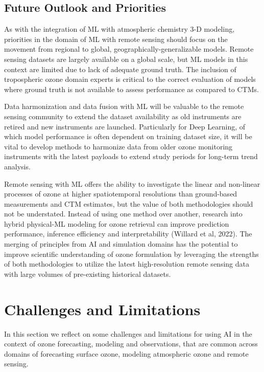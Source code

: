\documentclass[gmd, manuscript]{copernicus}
\begin{document}
\subsection{Future Outlook and Priorities}
As with the integration of ML with atmospheric chemistry 3-D modeling, priorities in the domain of ML with remote sensing should focus on the movement from regional to global, geographically-generalizable models. Remote sensing datasets are largely available on a global scale, but ML models in this context are limited due to lack of adequate ground truth. The inclusion of tropospheric ozone domain experts is critical to the correct evaluation of models where ground truth is not available to assess performance as compared to CTMs. 

Data harmonization and data fusion with ML will be valuable to the remote sensing community to extend the dataset availability as old instruments are retired and new instruments are launched. Particularly for Deep Learning, of which model performance is often dependent on training dataset size, it will be vital to develop methods to harmonize data from older ozone monitoring instruments with the latest payloads to extend study periods for long-term trend analysis. 

Remote sensing with ML offers the ability to investigate the linear and non-linear processes of ozone at higher spatiotemporal resolutions than ground-based measurements and CTM estimates, but the value of both methodologies should not be understated. Instead of using one method over another, research into hybrid physical-ML modeling for ozone retrieval can improve prediction performance, inference efficiency and interpretability (Willard et al, 2022). The merging of principles from AI and simulation domains has the potential to improve scientific understanding of ozone formulation by leveraging the strengths of both methodologies to utilize the latest high-resolution remote sensing data with large volumes of pre-existing historical datasets.

\section{Challenges and Limitations}
In this section we reflect on some challenges and limitations for using AI in the context of ozone forecasting, modeling and observations, that are common across domains of forecasting surface ozone, modeling atmospheric ozone and remote sensing. 
\end{document}
